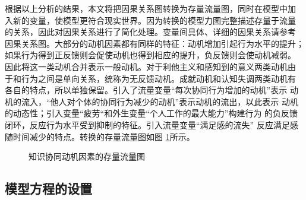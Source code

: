 根据以上分析的结果，本文将把因果关系图转换为存量流量图，同时在模型中加
入新的变量，使模型更符合现实世界。因为转换的模型力图完整描述存量于流量
的关系，因此对因果关系进行了简化处理。变量间具体、详细的因果关系请参考
因果关系图。大部分的动机因素都有同样的特征：动机增加引起行为水平的提升；
如果行为得到正反馈则会促使动机也得到相应的提升，负反馈则会使动机减弱。
因此将这一类动机合并表示一般动机。对于利他主义和感知到的意义两类动机由
于和行为之间是单向关系，统称为无反馈动机。成就动机和认知失调两类动机有
各自的特点，所以单独保留。引入了流量变量“每次协同行为增加的动机”表示
动机的流入，“他人对个体的协同行为减少的动机”表示动机的流出，以此表示
动机的动态性；引入变量“疲劳“和外生变量“个人工作的最大能力”构建行为
的负反馈闭环，反应行为水平受到抑制的特征。引入流量变量“满足感的流失”
反应满足感随时间减少的特点。转换的存量流量图如图
\ref{fig:refined-model}所示。
\begin{figure}[htb]
  \centering
  \caption{\small{知识协同动机因素的存量流量图}}
  \label{fig:refined-model}
\end{figure}

\subsection{模型方程的设置}

